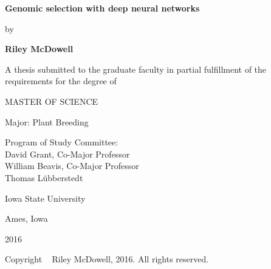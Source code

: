 \begin{titlepage}
\begin{center}

\textbf{Genomic selection with deep neural networks}

\vspace{0.5cm}

by

\vspace{0.5cm}

\textbf{Riley McDowell}

\vspace{2.0cm}

A thesis submitted to the graduate faculty in partial fulfillment of the requirements for the degree of

\vspace{0.5cm}

MASTER OF SCIENCE 

\vspace{2.0cm}

Major: Plant Breeding

\vspace{0.5cm}

Program of Study Committee: \\
David Grant, Co-Major Professor \\
William Beavis, Co-Major Professor \\
Thomas L{\"u}bberstedt \\

\vspace{5.0cm}

Iowa State University

\vspace{0.5cm}

Ames, Iowa

\vspace{0.5cm}

2016

\vspace{1.0cm}

Copyright \textcopyright~ Riley McDowell, 2016. All rights reserved.

\end{center}
\end{titlepage}

